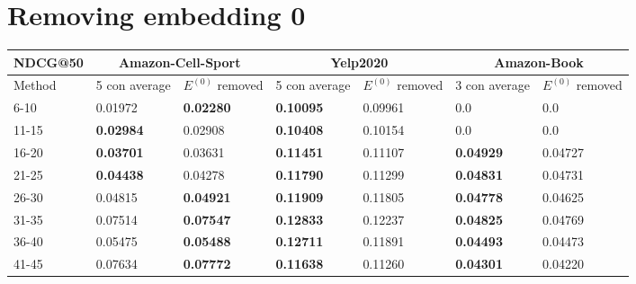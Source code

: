 \section{Removing embedding 0}

\begin{table*}[h!]
    \centering
    \begin{tabular}{|l|l|l||l|l||l|l|}
        \hline
        NDCG@50 & \multicolumn{2}{c||}{Amazon-Cell-Sport} & \multicolumn{2}{c||}{Yelp2020} & \multicolumn{2}{c|}{Amazon-Book}                                                            \\ \hline
        Method  & 5 con average                           & $E^{(0)}$ removed              & 5 con average                    & $E^{(0)}$ removed & 3 con average    & $E^{(0)}$ removed \\ \hline
        6-10    & 0.01972                                 & \textbf{0.02280}               & \textbf{0.10095}                 & 0.09961           & 0.0              & 0.0               \\ \hline
        11-15   & \textbf{0.02984}                        & 0.02908                        & \textbf{0.10408}                 & 0.10154           & 0.0              & 0.0               \\ \hline
        16-20   & \textbf{0.03701}                        & 0.03631                        & \textbf{0.11451}                 & 0.11107           & \textbf{0.04929} & 0.04727           \\ \hline
        21-25   & \textbf{0.04438}                        & 0.04278                        & \textbf{0.11790}                 & 0.11299           & \textbf{0.04831} & 0.04731           \\ \hline
        26-30   & 0.04815                                 & \textbf{0.04921}               & \textbf{0.11909}                 & 0.11805           & \textbf{0.04778} & 0.04625           \\ \hline
        31-35   & 0.07514                                 & \textbf{0.07547}               & \textbf{0.12833}                 & 0.12237           & \textbf{0.04825} & 0.04769           \\ \hline
        36-40   & 0.05475                                 & \textbf{0.05488}               & \textbf{0.12711}                 & 0.11891           & \textbf{0.04493} & 0.04473           \\ \hline
        41-45   & 0.07634                                 & \textbf{0.07772}               & \textbf{0.11638}                 & 0.11260           & \textbf{0.04301} & 0.04220           \\ \hline

\end{tabular}
\end{table*}

